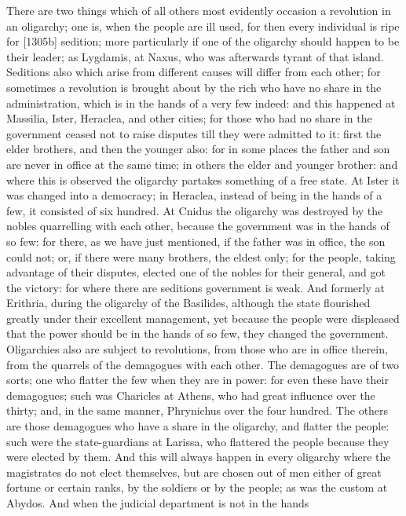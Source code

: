 There are two things which of all others most evidently occasion a
revolution in an oligarchy; one is, when the people are ill used, for then
every individual is ripe for [1305b] sedition; more particularly if one of
the oligarchy should happen to be their leader; as Lygdamis, at Naxus, who
was afterwards tyrant of that island. Seditions also which arise from
different causes will differ from each other; for sometimes a revolution
is brought about by the rich who have no share in the administration,
which is in the hands of a very few indeed: and this happened at Massilia,
Ister, Heraclea, and other cities; for those who had no share in the
government ceased not to raise disputes till they were admitted to it:
first the elder brothers, and then the younger also: for in some places
the father and son are never in office at the same time; in others the
elder and younger brother: and where this is observed the oligarchy
partakes something of a free state. At Ister it was changed into a
democracy; in Heraclea, instead of being in the hands of a few, it
consisted of six hundred. At Cnidus the oligarchy was destroyed by the
nobles quarrelling with each other, because the government was in the
hands of so few: for there, as we have just mentioned, if the father was
in office, the son could not; or, if there were many brothers, the eldest
only; for the people, taking advantage of their disputes, elected one of
the nobles for their general, and got the victory: for where there are
seditions government is weak. And formerly at Erithria, during the
oligarchy of the Basilides, although the state flourished greatly under
their excellent management, yet because the people were displeased that
the power should be in the hands of so few, they changed the government.
Oligarchies also are subject to revolutions, from those who are in office
therein, from the quarrels of the demagogues with each other. The
demagogues are of two sorts; one who flatter the few when they are in
power: for even these have their demagogues; such was Charicles at Athens,
who had great influence over the thirty; and, in the same manner,
Phrynichus over the four hundred. The others are those demagogues who have
a share in the oligarchy, and flatter the people: such were the
state-guardians at Larissa, who flattered the people because they were
elected by them. And this will always happen in every oligarchy where the
magistrates do not elect themselves, but are chosen out of men either of
great fortune or certain ranks, by the soldiers or by the people; as was
the custom at Abydos. And when the judicial department is not in the hands
